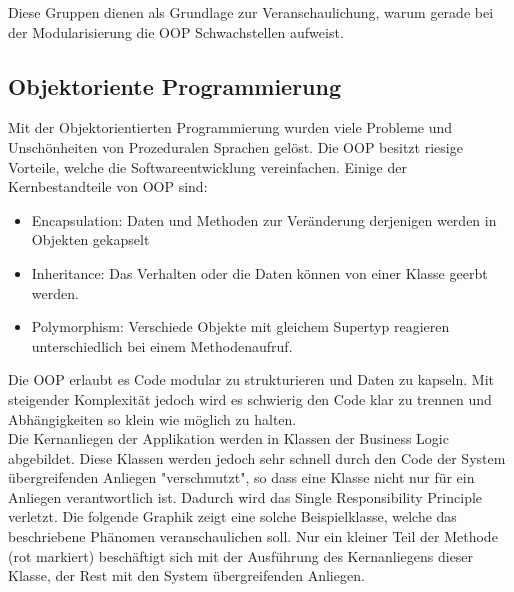 Diese Gruppen dienen als Grundlage zur Veranschaulichung, warum gerade bei der Modularisierung die OOP Schwachstellen aufweist.\newpage

\subsection{Objektoriente Programmierung}
\label{sec:aop_oop}

Mit der Objektorientierten Programmierung wurden viele Probleme und Unschönheiten von Prozeduralen Sprachen gelöst. Die OOP besitzt riesige Vorteile, welche die Softwareentwicklung vereinfachen. Einige der Kernbestandteile von OOP sind:

\begin{itemize}
	\item Encapsulation: Daten und Methoden zur Veränderung derjenigen werden in Objekten gekapselt
	\item Inheritance: Das Verhalten oder die Daten können von einer Klasse geerbt werden.
	\item Polymorphism: Verschiede Objekte mit gleichem Supertyp reagieren unterschiedlich bei einem Methodenaufruf.
\end{itemize}

Die OOP erlaubt es Code modular zu strukturieren und Daten zu kapseln. Mit steigender Komplexität jedoch wird es schwierig den Code klar zu trennen und Abhängigkeiten so klein wie möglich zu halten.\\

Die Kernanliegen der Applikation werden in Klassen der Business Logic abgebildet. Diese Klassen werden jedoch sehr schnell durch den Code der System übergreifenden Anliegen "verschmutzt", so dass eine Klasse nicht nur für ein Anliegen verantwortlich ist. Dadurch wird das Single Responsibility Principle verletzt. Die folgende Graphik zeigt eine solche Beispielklasse, welche das beschriebene Phänomen veranschaulichen soll. Nur ein kleiner Teil der Methode (rot markiert) beschäftigt sich mit der Ausführung des Kernanliegens dieser Klasse, der Rest mit den System übergreifenden Anliegen.

